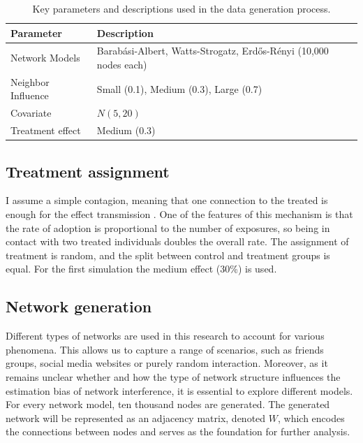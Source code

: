 \documentclass[a4paper,11pt]{article}
\begin{document}
\begin{table}[h!]
\centering
\begin{tabular}{|l|l|}
\hline
\textbf{Parameter}         & \textbf{Description}                                                                               \\ 
\hline
Network Models             & Barabási-Albert, Watts-Strogatz, Erdős-Rényi (10,000 nodes each)                                       \\ \hline
Neighbor Influence         & Small (0.1), Medium (0.3), Large (0.7)                                                                 \\ \hline
Covariate                & \(N(5, 20)\)                              \\ \hline
Treatment effect        & Medium (0.3)                                                                 \\ \hline
\end{tabular}
\caption{Key parameters and descriptions used in the data generation process.}
\label{tab:parameters}
\end{table}


\subsection{Treatment assignment}
I assume a simple contagion, meaning that one connection to the treated is enough for the effect transmission \cite{cencetti2023distinguishing}. One of the features of this mechanism is that the rate of adoption is proportional to the number of exposures, so being in contact with two treated individuals doubles the overall rate. The assignment of treatment is random, and the split between control and treatment groups is equal. For the first simulation the medium effect (30\%) is used. 

\subsection{Network generation}

Different types of networks are used in this research to account for various phenomena. This allows us to capture a range of scenarios, such as friends groups, social media websites or purely random interaction. Moreover, as it remains unclear whether and how the type of network structure influences the estimation bias of network interference, it is essential to explore different models. For every network model, ten thousand nodes are generated. The generated network will be represented as an adjacency matrix, denoted $W$, which encodes the connections between nodes and serves as the foundation for further analysis.
\end{document}
